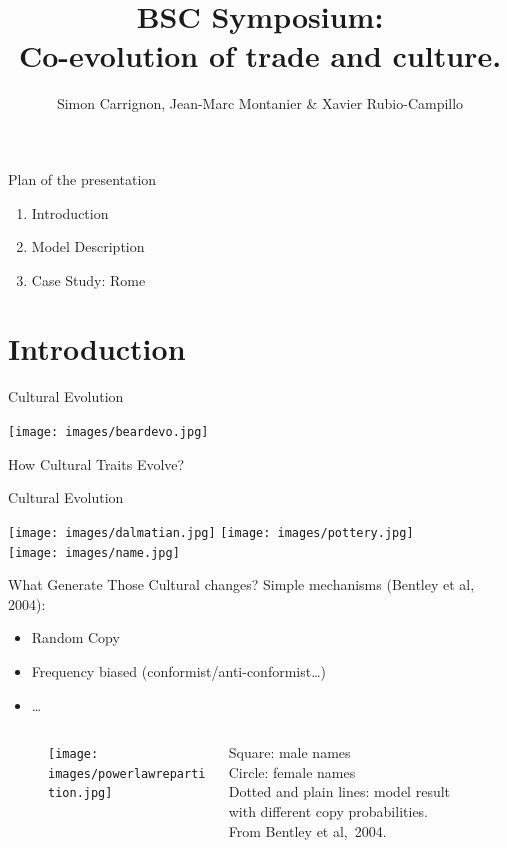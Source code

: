 \documentclass[12pt, handout=show,notes=show]{beamer}
\title{
	BSC Symposium:\\
	Co-evolution of trade and culture.
}
\institute{May 2016}
\author{Simon Carrignon, Jean-Marc Montanier \& Xavier Rubio-Campillo}
\date{
	\scriptsize
	\begin{columns}
		\begin{column}{.3\textwidth}
			\begin{center}
				Barcelona Supercomputing Center	\\
				\texttt{[image: images/bscLogo.jpg]} \hspace{2cm}
			\end{center}
		\end{column}
		\begin{column}{.3\textwidth}
			\begin{center}
				Univ. Pompeu Fabra Complex System Lab.\\
				\texttt{[image: images/upfLogo.jpeg]} %
			\end{center}
		\end{column}
	\end{columns}

}
\begin{document}
\begin{frame}
	\maketitle

\end{frame}

\begin{frame}{Plan of the presentation}
	\begin{enumerate}
		\item Introduction
			\vfill
		\item Model Description
			\vfill
		\item Case Study: Rome
			\vfill
	\end{enumerate}
	
\end{frame}

\section{Introduction}
\begin{frame}{Cultural Evolution}
	\begin{center}
		\texttt{[image: images/beardevo.jpg]} 
	\end{center}
	How Cultural Traits Evolve?
\end{frame}

\begin{frame}{Cultural Evolution}
	\begin{center}
		\texttt{[image: images/dalmatian.jpg]} \hspace{2cm}
		\texttt{[image: images/pottery.jpg]}\\
		\vspace{1cm}
		\texttt{[image: images/name.jpg]}
	\end{center}
\end{frame}

\begin{frame}{What Generate Those Cultural changes?}
	Simple mechanisms (Bentley et al, 2004):
	\begin{itemize}
		\item Random Copy 
		\item Frequency biased (conformist/anti-conformist\dots)
		\item \dots	
	\end{itemize}
	\begin{figure}
		\begin{columns}
			\begin{column}{.8\textwidth}
				\centering
				\texttt{[image: images/powerlawrepartition.jpg]}
			\end{column}
			\begin{column}{.3\textwidth}
				\tiny
				Square: male names\\
				Circle: female names\\
				Dotted and plain lines: model result with different copy probabilities.\\
			From Bentley et al,~2004.
			\end{column}
		\end{columns}
	\end{figure}
\end{frame}
\end{document}

